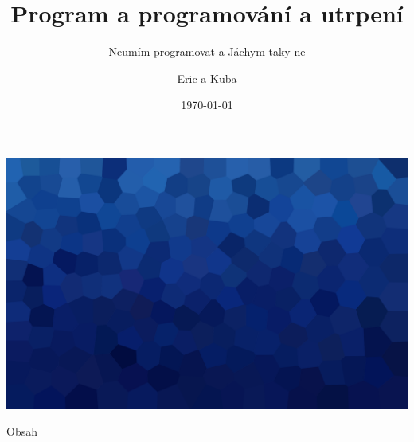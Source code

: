 \documentclass[aspectratio=169,xcolor=dvipsnames, t]{beamer}
\title[]{Program a programování a utrpení} %
\subtitle{Neumím programovat a Jáchym taky ne}
\author[Dusart]{Eric a Kuba}
\institute[GEVO]{Gymnázium Evolution Jižní Město}
\date{\today}
\begin{document}
\maketitlepage
{
{
    \includegraphics[width=\paperwidth,height=\paperheight]{AICStyleData/logos/mene_polygonu_bg.png}
}
\begin{frame}[t]{Obsah}
    \tableofcontents
\end{frame}
}
\end{document}
